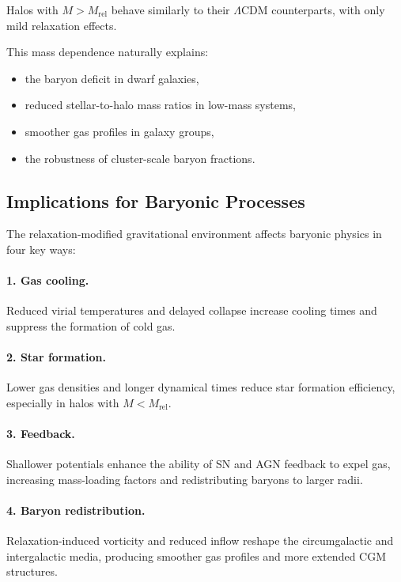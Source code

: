 \documentclass[11pt,a4paper]{article}
\begin{document}
Halos with $M > M_{\mathrm{rel}}$ behave similarly to their $\Lambda$CDM counterparts, with
only mild relaxation effects.

This mass dependence naturally explains:
\begin{itemize}
\item the baryon deficit in dwarf galaxies,
\item reduced stellar-to-halo mass ratios in low-mass systems,
\item smoother gas profiles in galaxy groups,
\item the robustness of cluster-scale baryon fractions.
\end{itemize}

\subsection{Implications for Baryonic Processes}

The relaxation-modified gravitational environment affects baryonic physics in four key ways:

\paragraph{1. Gas cooling.}
Reduced virial temperatures and delayed collapse increase cooling times and suppress the
formation of cold gas.

\paragraph{2. Star formation.}
Lower gas densities and longer dynamical times reduce star formation efficiency, especially
in halos with $M < M_{\mathrm{rel}}$.

\paragraph{3. Feedback.}
Shallower potentials enhance the ability of SN and AGN feedback to expel gas, increasing
mass-loading factors and redistributing baryons to larger radii.

\paragraph{4. Baryon redistribution.}
Relaxation-induced vorticity and reduced inflow reshape the circumgalactic and intergalactic
media, producing smoother gas profiles and more extended CGM structures.
\end{document}
